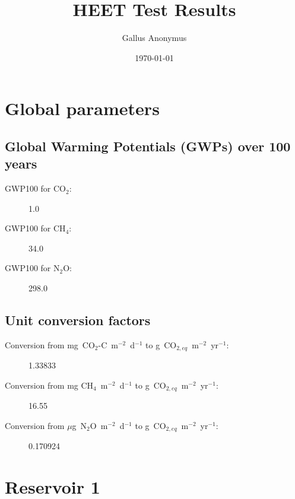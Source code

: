 \documentclass{article}%
\title{HEET Test Results}%
\author{Gallus Anonymus}%
\date{\today}%
\begin{document}
%
\normalsize%
\pagestyle{header}%
\maketitle%
\section{Global parameters}%
\label{sec:Globalparameters}%
\subsection{Global Warming Potentials (GWPs) over 100 years}%
\label{subsec:GlobalWarmingPotentials(GWPs)over100years}%
\begin{description}%
\item[GWP100 for CO$_2$: ]%
1.0%
\item[GWP100 for CH$_4$: ]%
34.0%
\item[GWP100 for N$_2$O: ]%
298.0%
\end{description}

%
\subsection{Unit conversion factors}%
\label{subsec:Unitconversionfactors}%
\begin{description}%
\item[Conversion from mg~CO$_2$-C~m$^{-2}$~d$^{-1}$ to g~CO$_{2,eq}$~m$^{-2}$~yr$^{-1}$: ]%
\num[round-precision=4,round-mode=figures]{1.33833}%
\end{description}%
\begin{description}%
\item[Conversion from mg CH$_4$~m$^{-2}$~d$^{-1}$ to g~CO$_{2,eq}$~m$^{-2}$~yr$^{-1}$: ]%
\num[round-precision=4,round-mode=figures]{16.55}%
\end{description}%
\begin{description}%
\item[Conversion from $\mu$g~N$_2$O~m$^{-2}$~d$^{-1}$ to g~CO$_{2,eq}$~m$^{-2}$~yr$^{-1}$: ]%
\num[round-precision=4,round-mode=figures]{0.170924}%
\end{description}

%
\pagebreak%
\section{Reservoir 1}%
\label{sec:Reservoir1}%
\end{document}
